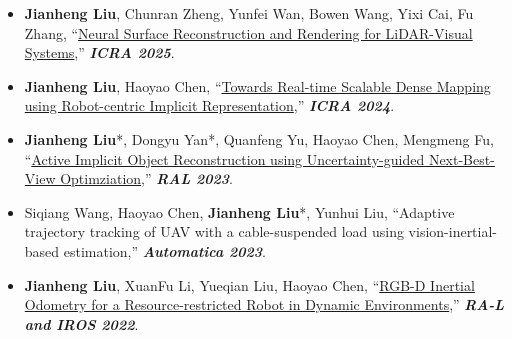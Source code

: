%
%



\begin{itemize}
	\item \textbf{Jianheng Liu}, Chunran Zheng, Yunfei Wan, Bowen Wang, Yixi Cai, Fu Zhang, ``\href{https://github.com/hku-mars/M2Mapping}{Neural Surface Reconstruction and Rendering for LiDAR-Visual Systems},''
	\textbf{\emph{ICRA 2025}}.\\
	\vspace{-8pt}
	\item \textbf{Jianheng Liu}, Haoyao Chen, ``\href{https://github.com/HITSZ-NRSL/RIM}{Towards Real-time Scalable Dense Mapping using Robot-centric Implicit Representation},''
	\textbf{\emph{ICRA 2024}}.\\
	\vspace{-8pt}
	\item \textbf{Jianheng Liu}*, Dongyu Yan*, Quanfeng Yu, Haoyao Chen, Mengmeng Fu, ``\href{https://arxiv.org/abs/2303.16739}{Active Implicit Object Reconstruction using Uncertainty-guided Next-Best-View Optimziation},''
	\textbf{\emph{RAL 2023}}.\\
	\vspace{-8pt}
	\item Siqiang Wang, Haoyao Chen, \textbf{Jianheng Liu}*, Yunhui Liu, ``Adaptive trajectory tracking of UAV with a cable-suspended load using vision-inertial-based estimation,''
	\textbf{\emph{Automatica 2023}}.\\
	\vspace{-8pt}
	\item \textbf{Jianheng Liu}, XuanFu Li, Yueqian Liu, Haoyao Chen, ``\href{https://github.com/HITSZ-NRSL/Dynamic-VINS}{RGB-D Inertial Odometry for a Resource-restricted Robot in Dynamic Environments},''
	\textbf{\emph{RA-L and IROS 2022}}.\\
	\vspace{-8pt}

\end{itemize}

